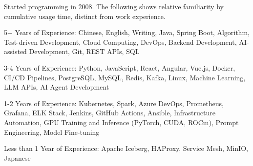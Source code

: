 

\begin{cventry}
    {} %
    {} %
    {} %
    {} %
    {
        \begin{cvitems}
            \item {Started programming in 2008. The following shows relative familiarity by cumulative usage time, distinct from work experience.}
            \item {5+ Years of Experience: Chinese, English, Writing, Java, Spring Boot, Algorithm, Test-driven Development, Cloud Computing, DevOps, Backend Development, AI-assisted Development, Git, REST APIs, SQL}
            \item {3-4 Years of Experience: Python, JavaScript, React, Angular, Vue.js, Docker, CI/CD Pipelines, PostgreSQL, MySQL, Redis, Kafka, Linux, Machine Learning, LLM APIs, AI Agent Development}
            \item {1-2 Years of Experience: Kubernetes, Spark, Azure DevOps, Prometheus, Grafana, ELK Stack, Jenkins, GitHub Actions, Ansible, Infrastructure Automation, GPU Training and Inference (PyTorch, CUDA, ROCm), Prompt Engineering, Model Fine-tuning}
            \item {Less than 1 Year of Experience: Apache Iceberg, HAProxy, Service Mesh, MinIO, Japanese}
        \end{cvitems}
    }
\end{cventry}
